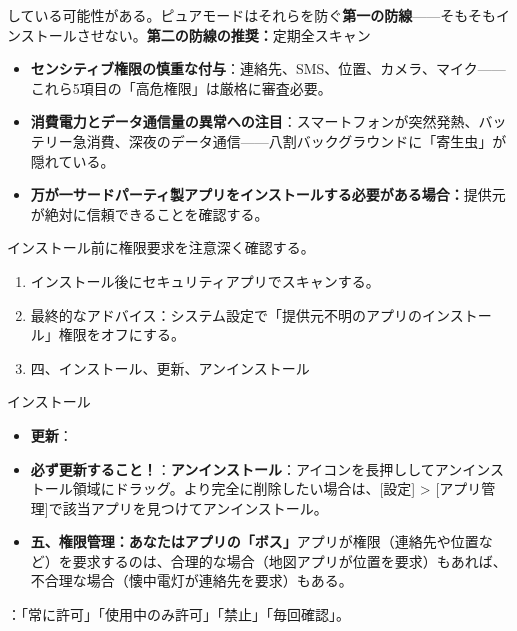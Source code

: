 している可能性がある。ピュアモードはそれらを防ぐ\textbf{第一の防線}——そもそもインストールさせない。\textbf{第二の防線の推奨：}定期全スキャン


\begin{itemize}
  \item \textbf{センシティブ権限の慎重な付与}：連絡先、SMS、位置、カメラ、マイク——これら5項目の「高危権限」は厳格に審査必要。
  \item \textbf{消費電力とデータ通信量の異常への注目}：スマートフォンが突然発熱、バッテリー急消費、深夜のデータ通信——八割バックグラウンドに「寄生虫」が隠れている。
  \item \textbf{万が一サードパーティ製アプリをインストールする必要がある場合：}提供元が絶対に信頼できることを確認する。
\end{itemize}

インストール前に権限要求を注意深く確認する。

\begin{enumerate}
  \item インストール後にセキュリティアプリでスキャンする。
  \item 最終的なアドバイス：システム設定で「提供元不明のアプリのインストール」権限をオフにする。
  \item 四、インストール、更新、アンインストール
\end{enumerate}

インストール


\begin{itemize}
  \item \textbf{更新}：
  \item \textbf{必ず更新すること！}：\textbf{アンインストール}：アイコンを長押ししてアンインストール領域にドラッグ。より完全に削除したい場合は、[設定] > [アプリ管理]で該当アプリを見つけてアンインストール。
  \item \textbf{五、権限管理：あなたはアプリの「ボス」}アプリが権限（連絡先や位置など）を要求するのは、合理的な場合（地図アプリが位置を要求）もあれば、不合理な場合（懐中電灯が連絡先を要求）もある。
\end{itemize}


：「常に許可」「使用中のみ許可」「禁止」「毎回確認」。


